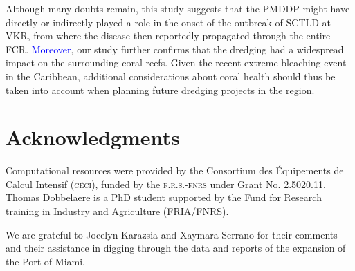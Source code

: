 \documentclass[preprint,12pt,authoryear]{elsarticle}
\newcommand{\modif}[1]{\textcolor{blue}{#1}}
\begin{document}
Although many doubts remain, this study suggests that the PMDDP might have directly or indirectly played a role in the onset of the outbreak of SCTLD at VKR, from where the disease then reportedly propagated through the entire FCR. \modif{Moreover}, our study further confirms that the dredging had a widespread impact on the surrounding coral reefs. Given the recent extreme bleaching event in the Caribbean, additional considerations about coral health should thus be taken into account when planning future dredging projects in the region.

\section*{Acknowledgments}
Computational resources were provided by the Consortium des \'Equipements de Calcul Intensif (\textsc{c\'eci}), funded by the \textsc{f.r.s.-fnrs} under Grant No. 2.5020.11. Thomas Dobbelaere is a PhD student supported by the Fund for Research training in Industry and Agriculture (\textsc{FRIA}/\textsc{FNRS}).

We are grateful to Jocelyn Karazsia and Xaymara Serrano for their comments and their assistance in digging through the data and reports of the expansion of the Port of Miami. 

 

\newpage
\appendix
\end{document}
